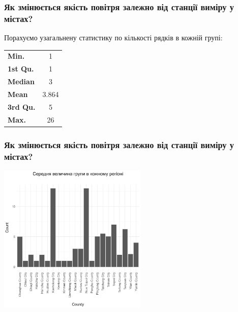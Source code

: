 \documentclass{beamer}
\begin{document}
\begin{frame}
  \frametitle{Як змінюється якість повітря залежно від станції виміру у містах?}

  Порахуємо узагальнену статистику по кількості рядків в кожній групі:

  \begin{center}
    \begin{tabular}{lc}
      \textbf{Min.}    & 1     \\
      \textbf{1st Qu.} & 1     \\
      \textbf{Median}  & 3     \\
      \textbf{Mean}    & 3.864 \\
      \textbf{3rd Qu.} & 5     \\
      \textbf{Max.}    & 26    \\
    \end{tabular}
  \end{center}
\end{frame}

\begin{frame}
  \frametitle{Як змінюється якість повітря залежно від станції виміру у містах?}

  \begin{center}
    \includegraphics[height=2.8in]{plots/question7/bar-count.png}
  \end{center}
\end{frame}
\end{document}
